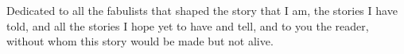 \thispagestyle{empty}
{}

\vspace*{3cm}

\begin{center}
    Dedicated to all the fabulists that shaped the story that I am, the stories I have told, and
    all the stories I hope yet to have and tell, and to you the reader, without whom this story
    would be made but not alive.
\end{center}

